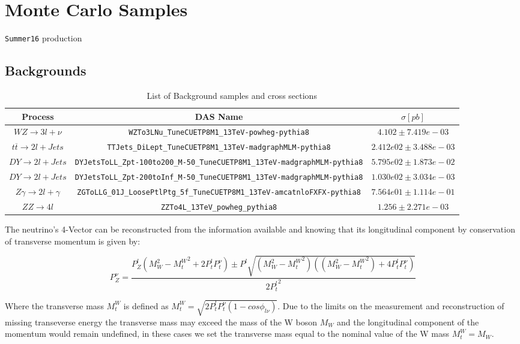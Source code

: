 
\section{Monte Carlo Samples}

\verb|Summer16| production

\subsection{Backgrounds}


\begin{table}
  \begin{center}
    \begin{adjustbox}{width=1\textwidth} 
      \begin{tabular}{ | c | c| c | }
        \hline
        Process & DAS Name & $\sigma [pb]$ \\
        \hline
        $WZ \rightarrow 3l + \nu $ & \verb|WZTo3LNu_TuneCUETP8M1_13TeV-powheg-pythia8| &  $4.102 \pm 7.419e-03$  \\
        \hline
        $t\overline{t} \rightarrow 2l + Jets$ & \verb|TTJets_DiLept_TuneCUETP8M1_13TeV-madgraphMLM-pythia8| & $2.412e02 \pm 3.488e-03$ \\
        \hline
        $DY \rightarrow 2l + Jets $ & \verb|DYJetsToLL_Zpt-100to200_M-50_TuneCUETP8M1_13TeV-madgraphMLM-pythia8| & $5.795e02 \pm 1.873e-02$  \\
        \hline
        $DY \rightarrow 2l + Jets $ & \verb|DYJetsToLL_Zpt-200toInf_M-50_TuneCUETP8M1_13TeV-madgraphMLM-pythia8| & $1.030e02 \pm 3.034e-03$ \\
        \hline
        $Z\gamma \rightarrow 2l + \gamma $ & \verb|ZGToLLG_01J_LoosePtlPtg_5f_TuneCUETP8M1_13TeV-amcatnloFXFX-pythia8| & $7.564e01 \pm 1.114e-01$ \\
        \hline
        $ZZ \rightarrow 4l $ & \verb|ZZTo4L_13TeV_powheg_pythia8| & $1.256 \pm 2.271e-03$ \\
        \hline
      \end{tabular}
    \end{adjustbox}
  \end{center}
  \caption{List of Background samples and cross sections}
\end{table}

The neutrino's 4-Vector can be reconstructed from the information available and
knowing that its longitudinal component by conservation of transverse momentum
is given by:

\[
P_{Z}^{\nu} = \frac{P_{Z}^{l}({M_{W}^{2}-{M_{t}^{W}}^2+2P_{t}^{l}{P_{t}^{\nu}}}) \pm P^{l}\sqrt{(M_{W}^{2}-{M_{t}^{W}}^2)((M_{W}^{2}-{M_{t}^{W}}^2)+4P_{t}^{l}P_{t}^{\nu})}}{{2P_{t}^{l}}^{2}}
\]

Where the transverse mass $M_{t}^{W}$ is defined as ${M_{t}^{W}}=\sqrt{2P_{t}^{l}P_{t}^{\nu}(1-cos\phi_{l\nu})}$.
Due to the limits on the measurement and reconstruction of missing transeverse
energy the transverse mass may exceed the mass of the W boson $M_W$ and the
longitudinal component of the momentum would remain undefined, in these cases
we set the transverse mass equal to the nominal value of the W mass $M_{t}^{W}=M_W$.


